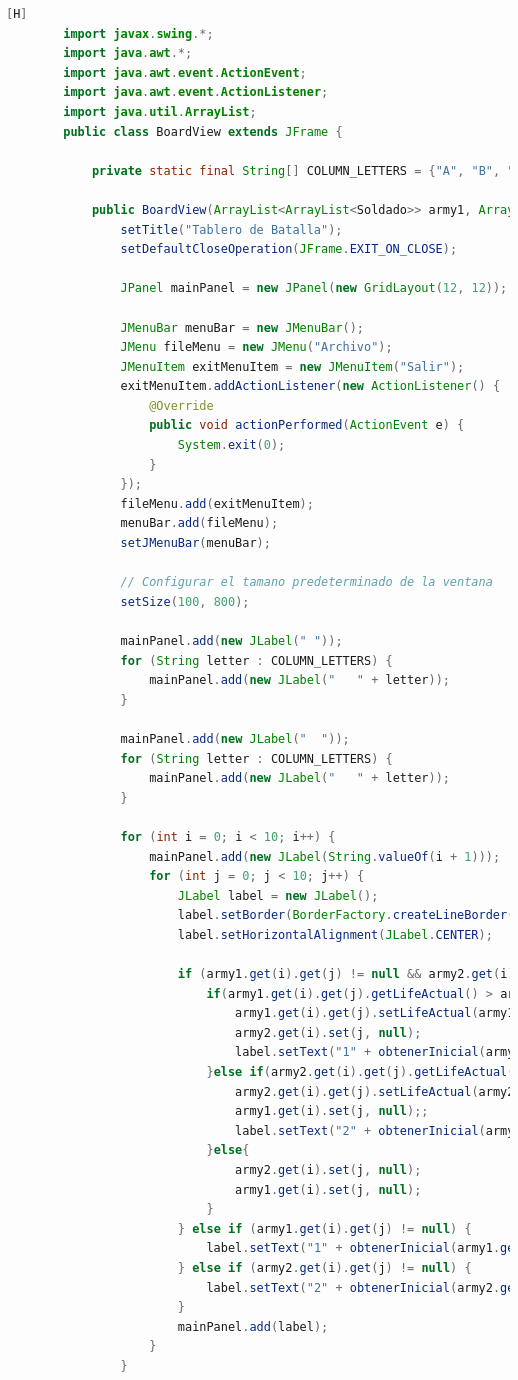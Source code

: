 \documentclass{article}
\begin{document}
	\begin{lstlisting}[language=java,caption={Las lineas de codigos de la clase BoardView}][H]
		import javax.swing.*;
		import java.awt.*;
		import java.awt.event.ActionEvent;
		import java.awt.event.ActionListener;
		import java.util.ArrayList;
		public class BoardView extends JFrame {
		
			private static final String[] COLUMN_LETTERS = {"A", "B", "C", "D", "E", "F", "G", "H", "I", "J"};
		
			public BoardView(ArrayList<ArrayList<Soldado>> army1, ArrayList<ArrayList<Soldado>> army2) {
				setTitle("Tablero de Batalla");
				setDefaultCloseOperation(JFrame.EXIT_ON_CLOSE);
		
				JPanel mainPanel = new JPanel(new GridLayout(12, 12));
		
				JMenuBar menuBar = new JMenuBar();
				JMenu fileMenu = new JMenu("Archivo");
				JMenuItem exitMenuItem = new JMenuItem("Salir");
				exitMenuItem.addActionListener(new ActionListener() {
					@Override
					public void actionPerformed(ActionEvent e) {
						System.exit(0);
					}
				});
				fileMenu.add(exitMenuItem);
				menuBar.add(fileMenu);
				setJMenuBar(menuBar);
		
				// Configurar el tamano predeterminado de la ventana
				setSize(100, 800);
		
				mainPanel.add(new JLabel(" "));
				for (String letter : COLUMN_LETTERS) {
					mainPanel.add(new JLabel("   " + letter));
				}
		
				mainPanel.add(new JLabel("  "));
				for (String letter : COLUMN_LETTERS) {
					mainPanel.add(new JLabel("   " + letter));
				}
		
				for (int i = 0; i < 10; i++) {
					mainPanel.add(new JLabel(String.valueOf(i + 1)));
					for (int j = 0; j < 10; j++) {
						JLabel label = new JLabel();
						label.setBorder(BorderFactory.createLineBorder(Color.BLACK));
						label.setHorizontalAlignment(JLabel.CENTER);
		
						if (army1.get(i).get(j) != null && army2.get(i).get(j) != null) {
							if(army1.get(i).get(j).getLifeActual() > army2.get(i).get(j).getLifeActual()){
								army1.get(i).get(j).setLifeActual(army1.get(i).get(j).getLifeActual() - army2.get(i).get(j).getLifeActual()); //Cambiamos 
								army2.get(i).set(j, null); 
								label.setText("1" + obtenerInicial(army1.get(i).get(j)) + army1.get(i).get(j).getLifeActual());
							}else if(army2.get(i).get(j).getLifeActual() > army1.get(i).get(j).getLifeActual()){
								army2.get(i).get(j).setLifeActual(army2.get(i).get(j).getLifeActual() - army1.get(i).get(j).getLifeActual());
								army1.get(i).set(j, null);;
								label.setText("2" + obtenerInicial(army2.get(i).get(j)) + army2.get(i).get(j).getLifeActual());
							}else{
								army2.get(i).set(j, null);
								army1.get(i).set(j, null);
							}
						} else if (army1.get(i).get(j) != null) {
							label.setText("1" + obtenerInicial(army1.get(i).get(j)) + army1.get(i).get(j).getLifeActual());
						} else if (army2.get(i).get(j) != null) {
							label.setText("2" + obtenerInicial(army2.get(i).get(j)) + army2.get(i).get(j).getLifeActual());
						}
						mainPanel.add(label);
					}
				}
		

\end{lstlisting}
\end{document}
